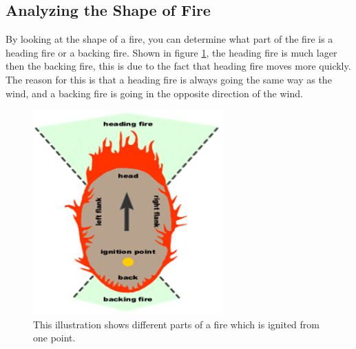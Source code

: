 \subsection{Analyzing the Shape of Fire}
By looking at the shape of a fire, you can determine what part of the fire is a heading fire or a backing fire. Shown in figure \ref{fig:fire-ignition}, the heading fire is much lager then the backing fire, this is due to the fact that heading fire moves more quickly. The reason for this is that a heading fire is always going the same way as the wind, and a backing fire is going in the opposite direction of the wind. \cite{firebev}
\begin{figure}[here]
  \centering
      \includegraphics[width=0.65\textwidth]{theory/graphics/fire-ignition.png}
  \caption{ This illustration shows different parts of a fire which is ignited from one point.\cite{firebev} }
  \label{fig:fire-ignition}
\end{figure}
